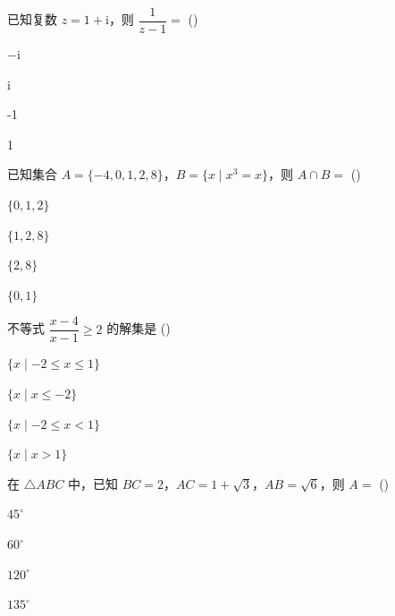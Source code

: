 \documentclass{exam-zh}
\begin{document}
\begin{question}
已知复数 $z=1+\mathrm{i}$，则 $\dfrac{1}{z-1}=$
(\hspace{1cm})
\begin{choices}
\item $-\mathrm{i}$
\item $\mathrm{i}$
\item -1
\item 1
\end{choices}
\end{question}


\begin{question}
已知集合 $A=\{-4,0,1,2,8\}$，$B=\{x \mid x^3=x\}$，则 $A \cap B =$
(\hspace{1cm})
\begin{choices}
\item $\{0,1,2\}$
\item $\{1,2,8\}$
\item $\{2,8\}$
\item $\{0,1\}$
\end{choices}
\end{question}


\begin{question}
不等式 $\dfrac{x-4}{x-1} \geqslant 2$ 的解集是
(\hspace{1cm})
\begin{choices}
\item $\{x \mid -2 \leqslant x \leqslant 1\}$
\item $\{x \mid x \leqslant -2\}$
\item $\{x \mid -2 \leqslant x < 1\}$
\item $\{x \mid x > 1\}$
\end{choices}
\end{question}


\begin{question}
在 $\triangle ABC$ 中，已知 $BC=2$，$AC=1+\sqrt{3}$，$AB=\sqrt{6}$，则 $A=$
(\hspace{1cm})
\begin{choices}
\item $45^\circ$
\item $60^\circ$
\item $120^\circ$
\item $135^\circ$
\end{choices}
\end{question}
\end{document}
